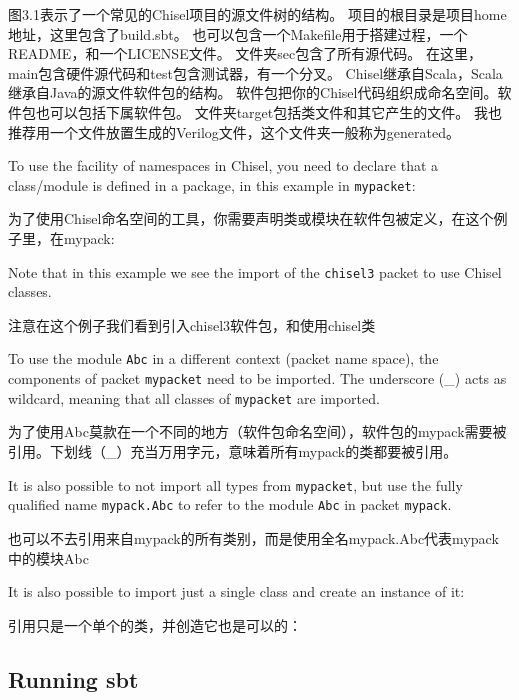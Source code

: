 \documentclass[%
    10pt,
    headinclude, footexclude,
    openright, %
    notitlepage,
    cleardoubleempty,
    headsepline,
    pointlessnumbers,
    bibtotoc, idxtotoc,
    ]{scrbook}
\newcommand{\code}[1]{{\small{\texttt{#1}}}}
\begin{document}
图3.1表示了一个常见的Chisel项目的源文件树的结构。
项目的根目录是项目home地址，这里包含了build.sbt。
也可以包含一个Makefile用于搭建过程，一个README，和一个LICENSE文件。
文件夹sec包含了所有源代码。
在这里，main包含硬件源代码和test包含测试器，有一个分叉。
Chisel继承自Scala，Scala继承自Java的源文件软件包的结构。
软件包把你的Chisel代码组织成命名空间。软件包也可以包括下属软件包。
文件夹target包括类文件和其它产生的文件。
我也推荐用一个文件放置生成的Verilog文件，这个文件夹一般称为generated。


To use the facility of namespaces in Chisel, you need to declare that a class/module
is defined in a package, in this example in \code{mypacket}:

为了使用Chisel命名空间的工具，你需要声明类或模块在软件包被定义，在这个例子里，在mypack:


\noindent Note that in this example we see the import of the \code{chisel3} packet
to use Chisel classes.

注意在这个例子我们看到引入chisel3软件包，和使用chisel类

To use the module \code{Abc} in a different context (packet name space),
the components of packet \code{mypacket} need to be imported. The underscore
(\_) acts as wildcard, meaning that all classes of \code{mypacket} are imported.

为了使用Abc莫款在一个不同的地方（软件包命名空间），软件包的mypack需要被引用。下划线（_）充当万用字元，意味着所有mypack的类都要被引用。



\noindent It is also possible to not import all types from \code{mypacket},
but use the fully qualified name \code{mypack.Abc} to refer to the module
\code{Abc} in packet \code{mypack}.

也可以不去引用来自mypack的所有类别，而是使用全名mypack.Abc代表mypack中的模块Abc


\noindent It is also possible to import just a single class and create an instance of it:

引用只是一个单个的类，并创造它也是可以的：



\subsection{Running sbt}
\end{document}
